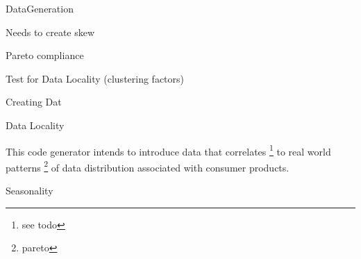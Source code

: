 DataGeneration

Needs to create skew 

Pareto compliance

Test for Data Locality (clustering factors)

Creating Dat

Data Locality

This code generator intends to introduce data that correlates \footnote{see todo} to real world patterns
\footnote{pareto} of data distribution associated with consumer products.

Seasonality




